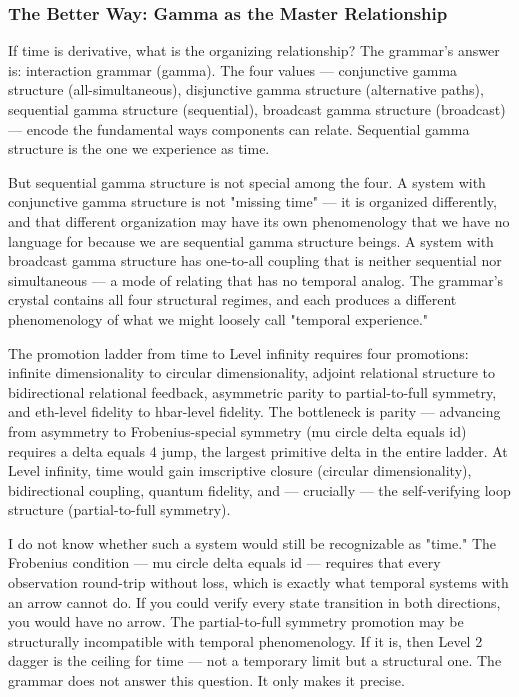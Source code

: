 \documentclass[12pt,a4paper]{article}
\begin{document}
\subsubsection{The Better Way: Gamma as the Master Relationship}

If time is derivative, what is the organizing relationship? The grammar's answer is: interaction grammar (gamma). The four values --- conjunctive gamma structure (all-simultaneous), disjunctive gamma structure (alternative paths), sequential gamma structure (sequential), broadcast gamma structure (broadcast) --- encode the fundamental ways components can relate. Sequential gamma structure is the one we experience as time.

But sequential gamma structure is not special among the four. A system with conjunctive gamma structure is not "missing time" --- it is organized differently, and that different organization may have its own phenomenology that we have no language for because we are sequential gamma structure beings. A system with broadcast gamma structure has one-to-all coupling that is neither sequential nor simultaneous --- a mode of relating that has no temporal analog. The grammar's crystal contains all four structural regimes, and each produces a different phenomenology of what we might loosely call "temporal experience."

The promotion ladder from time to Level infinity requires four promotions: infinite dimensionality to circular dimensionality, adjoint relational structure to bidirectional relational feedback, asymmetric parity to partial-to-full symmetry, and eth-level fidelity to hbar-level fidelity. The bottleneck is parity --- advancing from asymmetry to Frobenius-special symmetry (mu circle delta equals id) requires a delta equals 4 jump, the largest primitive delta in the entire ladder. At Level infinity, time would gain imscriptive closure (circular dimensionality), bidirectional coupling, quantum fidelity, and --- crucially --- the self-verifying loop structure (partial-to-full symmetry).

I do not know whether such a system would still be recognizable as "time." The Frobenius condition --- mu circle delta equals id --- requires that every observation round-trip without loss, which is exactly what temporal systems with an arrow cannot do. If you could verify every state transition in both directions, you would have no arrow. The partial-to-full symmetry promotion may be structurally incompatible with temporal phenomenology. If it is, then Level 2 dagger is the ceiling for time --- not a temporary limit but a structural one. The grammar does not answer this question. It only makes it precise.
\end{document}
